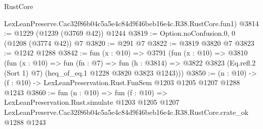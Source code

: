 \begin{lexlean}{RustCore}
\begin{coremodule}
    LexLeanPreserve.Cac32f86b04c5a5e4c84d9f46beb16e4c.R38.RustCore.fun1)
@3814 := @1229 (@1239 (@3769 @42)) @1244
@3819 := Option.noConfusion.{0, 0} (@1208 (@3774 @42)) @7
@3820 := @291 @7
@3822 := @3819 @3820 @7
@3823 := @1242 @1288
@3842 := fun (x : @10) =>
  @3791
    (fun (x : @10) =>
    @3810
      (fun (x : @10) =>
      fun (fn : @7) =>
      fun (h : @3814) =>
      @3822 @3823 (Eq.refl.{2} (Sort 1) @7) (heq_of_eq.{1} @1228 @3820 @3823 @1243)))
@3850 := (n : @10) -> (f : @10) -> LexLeanPreservation.Rust.FunSem @1203 @1205 @1207 @1288 @1243
@3860 := fun (n : @10) =>
  fun (f : @10) =>
  LexLeanPreservation.Rust.simulate
    @1203
    @1205
    @1207
    LexLeanPreserve.Cac32f86b04c5a5e4c84d9f46beb16e4c.R38.RustCore.crate_ok
    @1288
    @1243
\end{coremodule}
\end{lexlean}
